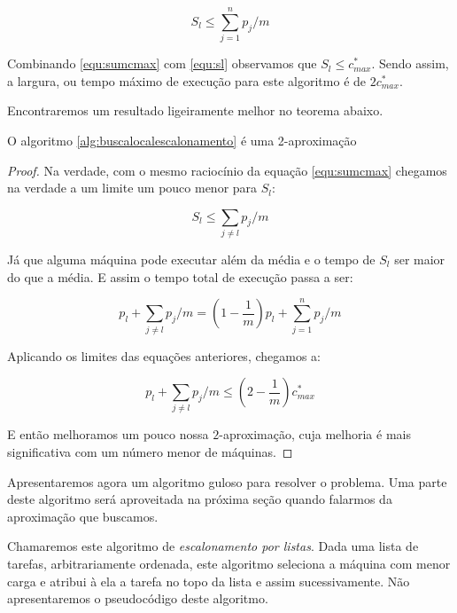 \begin{equation}
\label{equ:sl}
S_l \leq \sum_{j=1}^{n} p_j / m
\end{equation}

Combinando \ref{equ:sumcmax} com \ref{equ:sl} observamos que $S_l \leq c_{max}^*$. Sendo assim, a largura, ou tempo máximo de execução para este algoritmo é de $2c_{max}^*$.

Encontraremos um resultado ligeiramente melhor no teorema abaixo.

\begin{teorema}
O algoritmo \ref{alg:buscalocalescalonamento} é uma 2-aproximação
\end{teorema}

\begin{proof}

Na verdade, com o mesmo raciocínio da equação \ref{equ:sumcmax} chegamos na verdade a um limite um pouco menor para $S_l$:

\begin{equation}
S_l \leq \sum_{j \neq l} p_j / m
\end{equation}

Já que alguma máquina pode executar além da média e o tempo de $S_l$ ser maior do que a média. E assim o tempo total de execução passa a ser:

\begin{equation}
p_l + \sum_{j \neq l} p_j / m = \left(1 - \frac{1}{m}\right) p_l + \sum_{j=1}^{n} p_j / m
\end{equation}

Aplicando os limites das equações anteriores, chegamos a:

\begin{equation}
p_l + \sum_{j \neq l} p_j / m \leq \left(2-\frac {1}{m}\right)c_{max}^*
\end{equation}

E então melhoramos um pouco nossa $2$-aproximação, cuja melhoria é mais significativa com um número menor de máquinas.

\end{proof}

Apresentaremos agora um algoritmo guloso para resolver o problema. Uma parte deste algoritmo será aproveitada na próxima seção quando falarmos da aproximação que buscamos.

Chamaremos este algoritmo de \textit{escalonamento por listas}. Dada uma lista de tarefas, arbitrariamente ordenada, este algoritmo seleciona a máquina com menor carga e atribui à ela a tarefa no topo da lista e assim sucessivamente. Não apresentaremos o pseudocódigo deste algoritmo.

